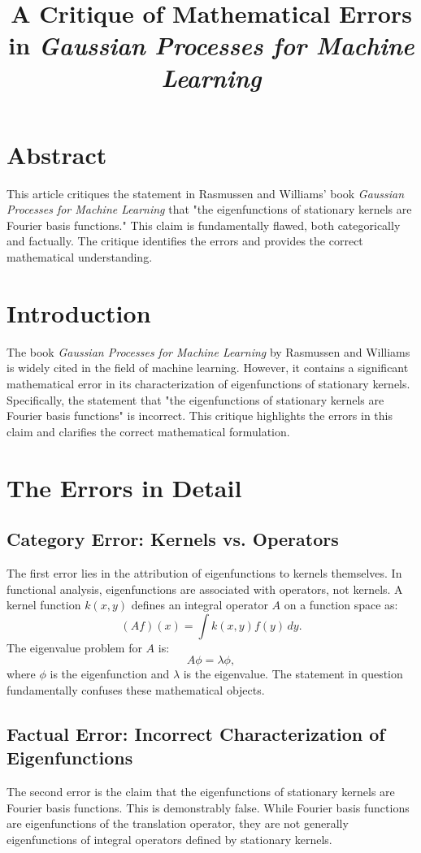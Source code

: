 \documentclass[12pt]{article}
\title{A Critique of Mathematical Errors in \textit{Gaussian Processes for Machine Learning}}
\author{}
\date{}
\begin{document}
\maketitle

\section*{Abstract}
This article critiques the statement in Rasmussen and Williams' book \textit{Gaussian Processes for Machine Learning} that "the eigenfunctions of stationary kernels are Fourier basis functions." This claim is fundamentally flawed, both categorically and factually. The critique identifies the errors and provides the correct mathematical understanding.

\section{Introduction}
The book \textit{Gaussian Processes for Machine Learning} by Rasmussen and Williams is widely cited in the field of machine learning. However, it contains a significant mathematical error in its characterization of eigenfunctions of stationary kernels. Specifically, the statement that "the eigenfunctions of stationary kernels are Fourier basis functions" is incorrect. This critique highlights the errors in this claim and clarifies the correct mathematical formulation.

\section{The Errors in Detail}
\subsection{Category Error: Kernels vs. Operators}
The first error lies in the attribution of eigenfunctions to kernels themselves. In functional analysis, eigenfunctions are associated with operators, not kernels. A kernel function $k(x, y)$ defines an integral operator $A$ on a function space as:
\[
(Af)(x) = \int k(x, y) f(y) \, dy.
\]
The eigenvalue problem for $A$ is:
\[
A\phi = \lambda \phi,
\]
where $\phi$ is the eigenfunction and $\lambda$ is the eigenvalue. The statement in question fundamentally confuses these mathematical objects.

\subsection{Factual Error: Incorrect Characterization of Eigenfunctions}
The second error is the claim that the eigenfunctions of stationary kernels are Fourier basis functions. This is demonstrably false. While Fourier basis functions are eigenfunctions of the translation operator, they are not generally eigenfunctions of integral operators defined by stationary kernels.
\end{document}
